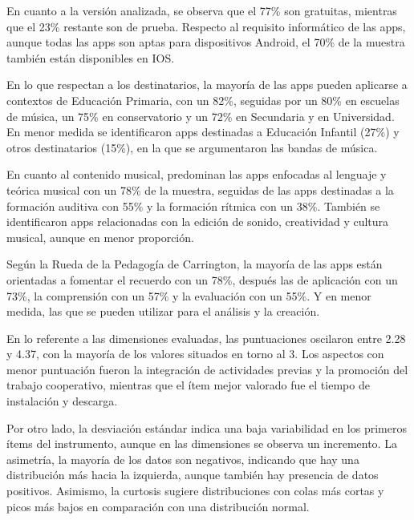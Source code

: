 \documentclass[spanish]{textolivre}
\begin{document}
En cuanto a la versión analizada, se observa que el 77\% son gratuitas, mientras que el 23\% restante son de prueba. Respecto al requisito informático de las apps, aunque todas las apps son aptas para dispositivos Android, el 70\% de la muestra también están disponibles en IOS. 

En lo que respectan a los destinatarios, la mayoría de las apps pueden aplicarse a contextos de Educación Primaria, con un 82\%, seguidas por un 80\% en escuelas de música, un 75\% en conservatorio y un 72\% en Secundaria y en Universidad. En menor medida se identificaron apps destinadas a Educación Infantil (27\%) y otros destinatarios (15\%), en la que se argumentaron las bandas de música. 

En cuanto al contenido musical, predominan las apps enfocadas al lenguaje y teórica musical con un 78\% de la muestra, seguidas de las apps destinadas a la formación auditiva con 55\% y la formación rítmica con un 38\%. También se identificaron apps relacionadas con la edición de sonido, creatividad y cultura musical, aunque en menor proporción.

Según la Rueda de la Pedagogía de Carrington, la mayoría de las apps están orientadas a fomentar el recuerdo con un 78\%, después las de aplicación con un 73\%, la comprensión con un 57\% y la evaluación con un 55\%. Y en menor medida, las que se pueden utilizar para el análisis y la creación. 

En lo referente a las dimensiones evaluadas, las puntuaciones oscilaron entre 2.28 y 4.37, con la mayoría de los valores situados en torno al 3. Los aspectos con menor puntuación fueron la integración de actividades previas y la promoción del trabajo cooperativo, mientras que el ítem mejor valorado fue el tiempo de instalación y descarga.

Por otro lado, la desviación estándar indica una baja variabilidad en los primeros ítems del instrumento, aunque en las dimensiones se observa un incremento. La asimetría, la mayoría de los datos son negativos, indicando que hay una distribución más hacia la izquierda, aunque también hay presencia de datos positivos. Asimismo, la curtosis sugiere distribuciones con colas más cortas y picos más bajos en comparación con una distribución normal.
\end{document}
